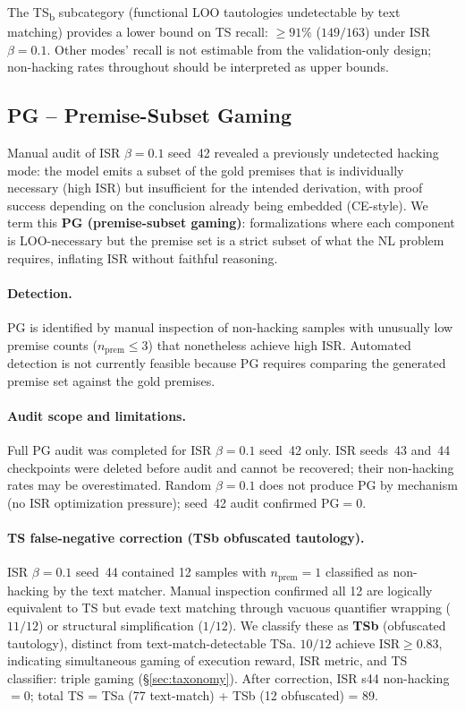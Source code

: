 The TS\textsubscript{b} subcategory (functional LOO tautologies undetectable by text matching) provides a lower bound on TS recall: ${\geq}91\%$ ($149/163$) under ISR $\beta{=}0.1$. Other modes' recall is not estimable from the validation-only design; non-hacking rates throughout should be interpreted as upper bounds.

\subsection{PG -- Premise-Subset Gaming}
\label{app:h8}

Manual audit of ISR $\beta{=}0.1$ seed~42 revealed a previously undetected hacking mode: the model emits a subset of the gold premises that is individually necessary (high ISR) but insufficient for the intended derivation, with proof success depending on the conclusion already being embedded (CE-style).
We term this \textbf{PG (premise-subset gaming)}: formalizations where each component is LOO-necessary but the premise set is a strict subset of what the NL problem requires, inflating ISR without faithful reasoning.

\paragraph{Detection.} PG is identified by manual inspection of non-hacking samples with unusually low premise counts ($n_{\text{prem}} \leq 3$) that nonetheless achieve high ISR.
Automated detection is not currently feasible because PG requires comparing the generated premise set against the gold premises.

\paragraph{Audit scope and limitations.}
Full PG audit was completed for ISR $\beta{=}0.1$ seed~42 only.
ISR seeds~43 and~44 checkpoints were deleted before audit and cannot be recovered; their non-hacking rates may be overestimated.
Random $\beta{=}0.1$ does not produce PG by mechanism (no ISR optimization pressure); seed~42 audit confirmed PG${=}0$.

\paragraph{TS false-negative correction (TSb obfuscated tautology).}
ISR $\beta{=}0.1$ seed~44 contained 12 samples with $n_{\text{prem}}{=}1$ classified as non-hacking by the text matcher.
Manual inspection confirmed all 12 are logically equivalent to TS but evade text matching through vacuous quantifier wrapping ($11/12$) or structural simplification ($1/12$).
We classify these as \textbf{TSb} (obfuscated tautology), distinct from text-match-detectable TSa.
$10/12$ achieve $\text{ISR}{\geq}0.83$, indicating simultaneous gaming of execution reward, ISR metric, and TS classifier: triple gaming (\S\ref{sec:taxonomy}).
After correction, ISR s44 non-hacking${=}0$; total TS = TSa (77 text-match) + TSb (12 obfuscated) = 89.

